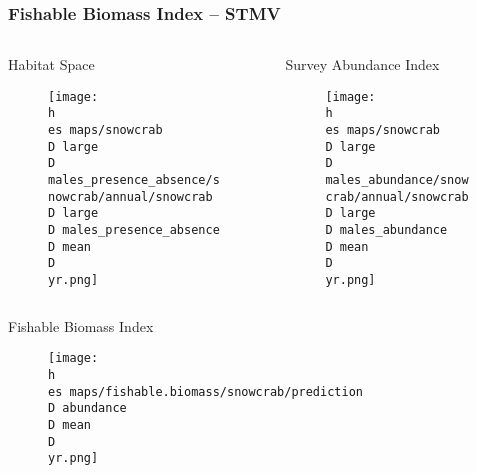 \documentclass{beamer}
\numberwithin{equation}{section}		%
\numberwithin{figure}{section}	   	%
\numberwithin{table}{section}				%
\newcommand{\yr}{2017}
\newcommand{\D}{.}  %
\newcommand{\h}{C:/} %
\newcommand{\es}{bio.data/bio.snowcrab/} %
\begin{document}
\begin{frame}
\frametitle{Fishable Biomass Index -- STMV}

\begin{columns}

\begin{column}{0.5\textwidth}
  \begin{center}
    Habitat Space
  \end{center}
  \vspace*{-0.6cm}
  	\begin{figure}
    \texttt{[image: \\h \\es maps/snowcrab\\D large\\D males\_presence\_absence/snowcrab/annual/snowcrab\\D large\\D males\_presence\_absence\\D mean\\D \\yr.png]}
  	\end{figure}
\end{column}

\begin{column}{0.5\textwidth}
  \begin{center}
    Survey Abundance Index 
  \end{center}
\vspace*{-0.6cm}
  \begin{figure}
    \texttt{[image: \\h \\es maps/snowcrab\\D large\\D males\_abundance/snowcrab/annual/snowcrab\\D large\\D males\_abundance\\D mean\\D \\yr.png]}
  \end{figure}
\end{column}

\end{columns}

\vspace*{0.2cm}
\begin{center}
Fishable Biomass Index
\end{center}
\vspace*{-0.2cm}
\begin{figure}
	\texttt{[image: \\h \\es maps/fishable.biomass/snowcrab/prediction\\D abundance\\D mean\\D \\yr.png]}
\end{figure}
	
\end{frame}


 
\end{document}

